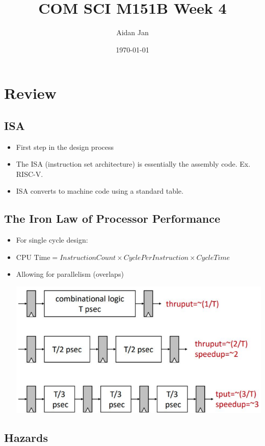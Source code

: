 \documentclass[10pt]{article}
\title{COM SCI M151B Week 4}
\author{Aidan Jan}
\date{\today}
\begin{document}
\maketitle

\section*{Review}
\subsection*{ISA}
\begin{itemize}
    \item First step in the design process
    \item The ISA (instruction set architecture) is essentially the assembly code.  Ex. RISC-V.
    \item ISA converts to machine code using a standard table.
\end{itemize}

\subsection*{The Iron Law of Processor Performance}
\begin{itemize}
    \item For single cycle design:
    \item $\text{CPU Time} = InstructionCount \times CyclePerInstruction \times CycleTime$
    \item Allowing for parallelism (overlaps)
    \begin{center}
        \includegraphics*[scale=0.7]{W4_1.png}
    \end{center}
\end{itemize}

\subsection*{Hazards}
\end{document}
